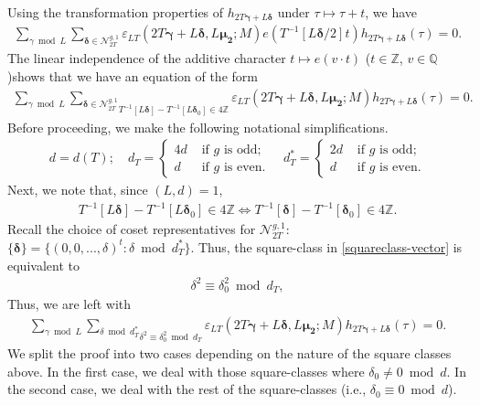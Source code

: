 \documentclass[11pt]{amsart}
\numberwithin{equation}{section}
\newcommand{\mc}{\mathcal}
\newcommand{\z}{\mathbb{Z}}
\newcommand{\Q}{\mathbb{Q}}
\newcommand{\q}{\quad}
\begin{document}
Using the transformation properties of $h_{2T\bm{\gamma}+L\bm\delta}$ under $\tau \mapsto \tau+t$, we have
\begin{align}
\sum_{\gamma\bmod L}\sum_{\bm{\delta}\in\mc N_{2T}^{g,1}}\varepsilon_{LT}(2T{\bm{ \gamma}}+L\bm\delta, L\bm{\mu_2};  M) e(T^{-1}[L\bm\delta/2]t)h_{2T{\bm{ \gamma}}+L\bm{\delta}}(\tau)=0.
\end{align} 
The linear independence of the additive character $t \mapsto e(v \cdot t)$ ($t \in \z$, $v \in \Q$)shows that we have an equation of the form
\begin{align}
   \sum_{\gamma\bmod L} \underset{T^{-1}[L\bm\delta] - T^{-1}[L\bm\delta_0] \in 4 \z }{\sum_{\bm\delta\in\mc N_{2T}^{g,1}}}\varepsilon_{LT}(2T{\bm{ \gamma}}+L\bm\delta, L\bm{\mu_2};  M)h_{2T{\bm{ \gamma}}+L\bm{\delta}}(\tau)=0.
\end{align}
Before proceeding, we make the following notational simplifications.
\begin{align}
d=d(T);\q d_T=\begin{cases}
    4d & \text{ if } g \text{ is odd;}\\
    d & \text{ if } g \text{ is even.}
\end{cases} \q d_T^*=\begin{cases}
    2d & \text{ if } g \text{ is odd;}\\
    d & \text{ if } g \text{ is even.}
\end{cases}
\end{align}
Next, we note that, since $(L, d)=1$,  
\begin{align}\label{squareclass-vector}
T^{-1}[L\bm\delta] - T^{-1}[L\bm\delta_0] \in 4 \z \iff T^{-1}[\bm\delta] - T^{-1}[\bm\delta_0] \in 4 \z .
\end{align}
Recall the choice of coset representatives for $\mc N_{2T}^{g,1}$: $\{\bm\delta\}=\{(0,0,...,\delta)^t: \delta\bmod d_T^*\}$. Thus, the square-class in \eqref{squareclass-vector} is equivalent to
\begin{align}
    {\delta}^2\equiv {\delta}_{0}^2 \bmod d_T,
\end{align}
Thus, we are left with
\begin{align}\label{lin-eq-sqrcls}
    \sum_{\gamma\bmod L} \underset{{\delta}^2\equiv {\delta}_{0}^2 \bmod d_T}{\sum_{\delta\bmod d_T^*}}\varepsilon_{LT}(2T{\bm{ \gamma}}+L\bm\delta, L\bm{\mu_2};  M)h_{2T{\bm{ \gamma}}+L\bm{\delta}}(\tau)=0.
\end{align}
We split the proof into two cases depending on the nature of the square classes above. In the first case, we deal with those square-classes where $\delta_0\neq 0 \bmod d$. In the second case, we deal with the rest of the square-classes (i.e., $\delta_0\equiv 0\bmod d$).
\end{document}

